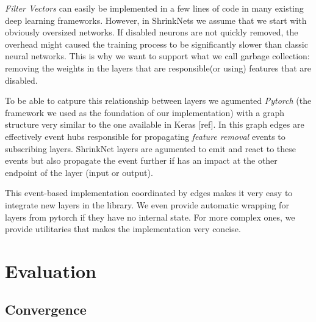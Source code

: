 \documentclass[sigconf]{acmart}
\begin{document}
\par \textit{Filter Vectors} can easily be implemented in a few lines of code
in many existing deep learning frameworks. However, in ShrinkNets we assume
that we start with obviously oversized networks. If disabled neurons are not
quickly removed, the overhead might caused the training process to be
significantly slower than classic neural networks. This is why we want to
support what we call garbage collection: removing the weights in the layers
that are responsible(or using) features that are disabled.
\par To be able to catpure this relationship between layers we agumented
\textit{Pytorch} (the framework we used as the foundation of our implementation)
with a graph structure very similar to the one available in Keras [ref].
In this graph edges are effectively event hubs responsible for propagating
\textit{feature removal} events to subscribing layers. ShrinkNet layers are
agumented to emit and react to these events but also propagate the event
further if has an impact at the other endpoint of the layer (input or output).
\par This event-based implementation coordinated by edges makes it very easy
to integrate new layers in the library. We even provide automatic wrapping
for layers from pytorch if they have no internal state. For more complex ones,
we provide utilitaries that makes the implementation very concise.

\section{Evaluation}
\subsection{Convergence}
\end{document}
